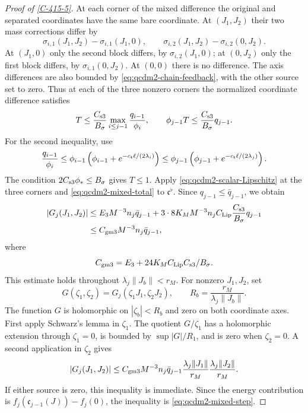 \documentclass[11pt,letterpaper,reqno]{amsart}
\theoremstyle{definition}
\theoremstyle{remark}
\begin{document}
\begin{proof}[Proof of \cref{C-415-5}]
At each corner of the mixed difference the original and
separated coordinates have the same bare coordinate.
At $(J_1,J_2)$ their two mass corrections differ by
\[
 \sigma_{i,1}(J_1,J_2)-\sigma_{i,1}(J_1,0),\qquad
 \sigma_{i,2}(J_1,J_2)-\sigma_{i,2}(0,J_2).
\]
At $(J_1,0)$ only the second block differs, by
$\sigma_{i,2}(J_1,0)$; at $(0,J_2)$ only the first
block differs, by $\sigma_{i,1}(0,J_2)$.
At $(0,0)$ there is no difference.  The axis differences
are also bounded by
\eqref{eq:qcdm2-chain-feedback}, with the other source
set to zero.  Thus at each of the three nonzero corners
the normalized coordinate difference satisfies
\[
 T\le\frac{C_{\rm s3}}{B_\sigma}
            \max_{i\le j-1}\frac{q_{i-1}}{\phi_i},
 \qquad
 \phi_{j-1}T\le\frac{C_{\rm s3}}{B_\sigma}q_{j-1}.
\]
For the second inequality, use
\[
 \frac{q_{i-1}}{\phi_i}
 \le\phi_{i-1}
       \left(\phi_{i-1}+e^{-c_{\rm t}\ell/(2\lambda_i)}\right)
 \le\phi_{j-1}
       \left(\phi_{j-1}+e^{-c_{\rm t}\ell/(2\lambda_j)}\right).
\]
The condition $2C_{\rm s3}\phi_*\le B_\sigma$ gives
$T\le1$.  Apply \eqref{eq:qcdm2-scalar-Lipschitz}
at the three corners and
\eqref{eq:qcdm2-mixed-total} to $\mathfrak c^\flat$.
Since $q_{j-1}\le\bar q_{j-1}$, we obtain
\begin{align*}
 |G_j(J_1,J_2)|
 &\le E_3M^{-3}n_j\bar q_{j-1}
       +3\cdot8K_MM^{-3}n_jC_{\rm Lip}
                    \frac{C_{\rm s3}}{B_\sigma}q_{j-1}\\
 &\le C_{\rm gm3}M^{-3}n_j\bar q_{j-1},
\end{align*}
where
\[
 C_{\rm gm3}=E_3+24K_MC_{\rm Lip}C_{\rm s3}/B_\sigma.
\]
This estimate holds throughout $\lambda_j\|J_b\|<r_M$.
For nonzero $J_1,J_2$, set
\[
 G(\zeta_1,\zeta_2)=G_j(\zeta_1J_1,\zeta_2J_2),\qquad
 R_b=\frac{r_M}{\lambda_j\|J_b\|}.
\]
The function $G$ is holomorphic on $|\zeta_b|<R_b$
and zero on both coordinate axes.  First apply Schwarz's
lemma in $\zeta_1$.  The quotient $G/\zeta_1$ has a
holomorphic extension through $\zeta_1=0$, is bounded
by $\sup|G|/R_1$, and is zero when $\zeta_2=0$.
A second application in $\zeta_2$ gives
\[
 |G_j(J_1,J_2)|\le C_{\rm gm3}M^{-3}n_j\bar q_{j-1}
      \frac{\lambda_j\|J_1\|}{r_M}
      \frac{\lambda_j\|J_2\|}{r_M}.
\]
If either source is zero, this inequality is immediate.
Since the energy contribution is
$f_j(\mathfrak c_{j-1}(J))-f_j(0)$, the inequality is
\eqref{eq:qcdm2-mixed-step}.


\end{proof}
\end{document}
